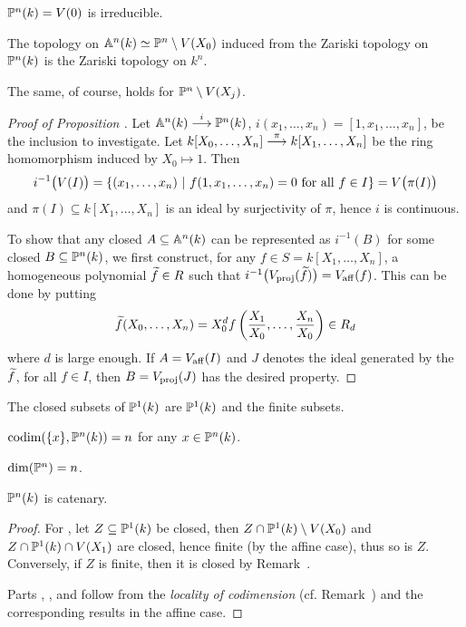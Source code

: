 \documentclass[a4paper,parskip=half,numbers=enddot, DIV=12]{scrreprt}
\begin{document}
\begin{cor*}
$\mathbb{P}^n(k) = V(0)$ is irreducible.
\end{cor*}
\begin{prop}
The topology on $\mathbb{A}^n(k) \simeq \mathbb{P}^n\setminus V(X_0)$ induced from the Zariski topology on $\mathbb{P}^n(k)$ is the Zariski topology on $k^n$.
\end{prop}
\begin{rem*}
The same, of course, holds for $\mathbb{P}^n\setminus V(X_j)$.
\end{rem*}
\begin{proof}[Proof of Proposition ]
Let $\IA^n(k)\morphism[i]\IP^n(k)$, $i(x_1,\ldots,x_n) = [1,x_1,\ldots,x_n]$, be the inclusion to investigate. Let $k[X_0,\ldots,X_n]\morphism[\pi]k[X_1,\ldots,X_n]$ be the ring homomorphism induced by $X_0\mapsto 1$. Then 
\begin{align*}
	i^{-1}\big(V(I)\big)=\left\{(x_1,\ldots,x_n) \ \middle|\  f(1,x_1,\ldots,x_n) = 0\text{ for all }f\in I\right\}=V\big(\pi(I)\big)
\end{align*}
and $\pi(I)\subseteq k[X_1,\ldots,X_n]$ is an ideal by surjectivity of $\pi$, hence $i$ is continuous.

To show that any closed $A\subseteq \mathbb{A}^n(k)$ can be represented as $i^{-1}(B)$ for some closed $B\subseteq \mathbb{P}^n(k)$, we first construct,
for any $f\in S = k[X_1,\ldots,X_n]$, a homogeneous polynomial $\snake f\in R$ such that $i^{-1}\big(V_\proj(\snake f)\big) = V_\aff(f)$.
This can be done by putting \begin{align*}
\snake f (X_0,\ldots,X_n)  = X_0^d f\left(\frac{X_1}{X_0},\ldots,\frac{X_n}{X_0}\right) \in R_d
\end{align*}
where $d$ is large enough. If $A = V_{\mathrm{aff}}(I)$ and $J$ denotes the ideal generated by the $\snake f$, for all $f\in I$,
then $B = V_{\mathrm{proj}}(J)$ has the desired property.
\end{proof}
\begin{cor}
\begin{alphanumerate}
\item The closed subsets of $\mathbb{P}^1(k)$ are $\mathbb{P}^1(k)$ and the finite subsets.
\item $\operatorname{codim}(\{x\},\mathbb{P}^n(k)) = n$ for any $x\in \mathbb{P}^n(k)$.
\item $\dim(\mathbb{P}^n)=n$.
\item $\mathbb{P}^n(k)$ is catenary.
\end{alphanumerate}
\end{cor}
\begin{proof}
	For , let $Z\subseteq\mathbb{P}^1(k)$ be closed, then $Z\cap\mathbb{P}^1(k)\setminus V(X_0)$ and $Z\cap \mathbb{P}^1(k)\cap V(X_1)$ are closed, hence finite (by the affine case), thus so is $Z$. Conversely, if $Z$ is finite, then it is closed by Remark~.
	
	Parts , , and  follow from the \emph{locality of codimension} (cf. Remark~) and the corresponding results in the affine case.
\end{proof}
\end{document}
